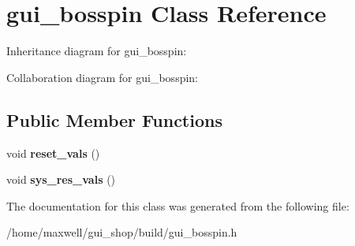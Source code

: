 \hypertarget{classgui__bosspin}{}\section{gui\+\_\+bosspin Class Reference}
\label{classgui__bosspin}


Inheritance diagram for gui\+\_\+bosspin\+:


Collaboration diagram for gui\+\_\+bosspin\+:
\subsection*{Public Member Functions}
\begin{DoxyCompactItemize}
\item 
void {\bfseries reset\+\_\+vals} ()\hypertarget{classgui__bosspin_a74ad119b43bd266a360bb855e8e09f3b}{}\label{classgui__bosspin_a74ad119b43bd266a360bb855e8e09f3b}

\item 
void {\bfseries sys\+\_\+res\+\_\+vals} ()\hypertarget{classgui__bosspin_a63eadfa8904dbec6212b56a0fee22342}{}\label{classgui__bosspin_a63eadfa8904dbec6212b56a0fee22342}

\end{DoxyCompactItemize}


The documentation for this class was generated from the following file\+:\begin{DoxyCompactItemize}
\item 
/home/maxwell/gui\+\_\+shop/build/gui\+\_\+bosspin.\+h\end{DoxyCompactItemize}
